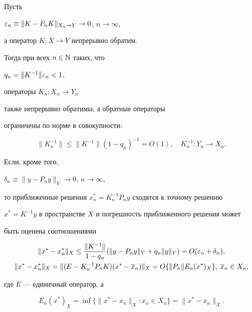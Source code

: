 \begin{lems}


Пусть


$\varepsilon_n\equiv \|K-P_nK\|_{X_n\to Y}\to 0$, $n\to \infty$,


а оператор $K:X\to Y$ непрерывно обратим.


Тогда при всех $n \in \Bbb N$ таких, что


$q_n=\|K^{-1}\|\varepsilon_n < 1$,


операторы $K_n:X_n\to Y_n$


также непрерывно обратимы, а обратные операторы


ограничены по норме в совокупности$:$


$$


\|K_n^{-1}\|\le \|K^{-1}\|(1-q_n)^{-1}=O(1),\quad K_n^{-1}:Y_n\to X_n.


$$


Если, кроме того,


$\delta_n\equiv \|y-P_ny\|_Y\to 0$, $n\to \infty$,


то приближенные решения $x_n^*=K_n^{-1}P_ny$ сходятся к точному решению


$x^*=K^{-1}y$ в пространстве $X$ и погрешность приближенного решения может


быть оценена соотношениями


\begin{gather*}


\|x^*-x^*_n\|_X\le \frac{\|K^{-1}\|}{1-q_n}(\|y-P_ny\|_Y+


q_n\|y\|_Y)=O(\ve_n+\delta_n), \\


%


\|x^*-x^*_n\|_X=\|(E-K_n^{-1}P_nK)(x^*-\overline{x}_n)\|_X


=O\{\|P_n\|E_n(x^*)_X\},\; \overline{x}_n \in X_n,


\end{gather*}


где $E$ --- единичный оператор, а


$$


E_n(x^*)_X=\inf \{\|x^*-x_n\|_X:x_n\in X_n\}=\|x^*-\overline{x}_n\|_X.


$$


\end{lems}






